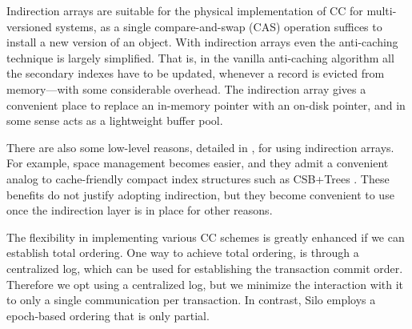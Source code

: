Indirection arrays are suitable for the physical implementation of CC for multi-versioned systems, as a single compare-and-swap (CAS) operation suffices to install a new version of an object. 
With indirection arrays even the anti-caching technique \cite{DeBrabantPTSZ13} is largely simplified. That is, in the vanilla anti-caching algorithm all the secondary indexes have to be updated, whenever a record is evicted from memory---with some considerable overhead. The indirection array gives a convenient place to replace an in-memory pointer with an on-disk pointer, and in some sense acts as a lightweight buffer pool. 

There are also some low-level reasons, detailed in , for using indirection arrays. 
For example, space management becomes easier, and they admit a convenient analog to cache-friendly compact index structures such as CSB+Trees \cite{RaoR00}. These benefits do not justify adopting indirection, but they become convenient to use once the indirection layer is in place for other reasons.

The flexibility in implementing various CC schemes is greatly enhanced if we can establish total ordering. One way to achieve total ordering, is through a centralized log, which can be used for establishing the transaction commit order. Therefore we opt using a centralized log, but we minimize the interaction with it to only a single communication per transaction. 
In contrast, Silo employs a epoch-based ordering that is only partial. 


